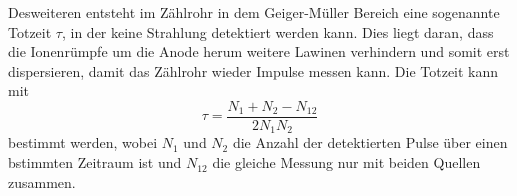 \noindent Desweiteren entsteht im Zählrohr in dem Geiger-Müller Bereich eine sogenannte Totzeit $\tau$, in der keine
Strahlung detektiert werden kann. Dies liegt daran, dass die Ionenrümpfe um die Anode herum weitere Lawinen verhindern
und somit erst dispersieren, damit das Zählrohr wieder Impulse messen kann. Die Totzeit kann mit
\begin{equation}
    \tau=\frac{N_1+N_2-N_{12}}{2N_1N_2}
    \label{eqn:totzeit}
\end{equation}
bestimmt werden, wobei $N_1$ und $N_2$ die Anzahl der detektierten Pulse über einen bstimmten Zeitraum ist
und $N_{12}$ die gleiche Messung nur mit beiden Quellen zusammen.
